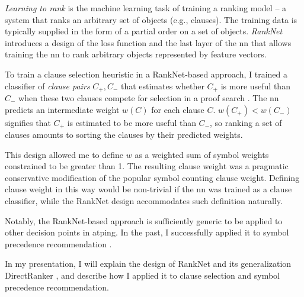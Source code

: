 \documentclass{easychair}
\newcommand{\pc}[1]{\SI[round-mode=places,round-precision=1]{#1}{\percent}}
\begin{document}
\emph{Learning to rank} is the machine learning task of training a ranking model --
a system that ranks an arbitrary set of objects (e.g., clauses).
The training data is typically supplied in the form of a partial order on a set of objects.
\emph{RankNet} \cite{DBLP:conf/icml/BurgesSRLDHH05}
introduces a design of the loss function and the last layer of the \gls{nn}
that allows training the \gls{nn} to rank arbitrary objects represented by feature vectors.

To train a clause selection heuristic in a RankNet-based approach,
I trained a classifier of \emph{clause pairs} $C_+, C_-$ that estimates whether $C_+$ is more useful than $C_-$
when these two clauses compete for selection in a proof search \cite{DBLP:conf/lpar/Bartek023}.
The \gls{nn} predicts an intermediate weight $w(C)$ for each clause $C$.
$w(C_+) < w(C_-)$ signifies that $C_+$ is estimated to be more useful than $C_-$,
so ranking a set of clauses amounts to sorting the clauses by their predicted weights.

This design allowed me to define $w$ as a weighted sum of symbol weights constrained to be greater than 1.
The resulting clause weight was a pragmatic conservative modification of the popular symbol counting clause weight.
Defining clause weight in this way would be non-trivial if the \gls{nn} was trained as a clause classifier,
while the RankNet design accommodates such definition naturally.


Notably, the RankNet-based approach is sufficiently generic to be applied to other decision points in \gls{atping}.
In the past, I successfully applied it to symbol precedence recommendation \cite{DBLP:conf/cade/Bartek021}.

In my presentation, I will explain the design of RankNet and its generalization DirectRanker \cite{DBLP:conf/pkdd/KoppelSWPK019},
and describe how I applied it to clause selection and symbol precedence recommendation.



\end{document}
